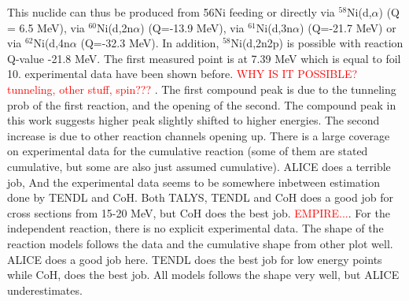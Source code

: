 This nuclide can thus be produced from 56Ni feeding or directly via $^{58}$Ni(d,$\alpha$) (Q = 6.5 MeV), via $^{60}$Ni(d,2n$\alpha$) (Q=-13.9 MeV), via $^{61}$Ni(d,3n$\alpha$) (Q=-21.7 MeV) or via $^{62}$Ni(d,4n$\alpha$ (Q=-32.3 MeV). In addition, $^{58}$Ni(d,2n2p) is possible with reaction Q-value -21.8 MeV. The first measured point is at 7.39 MeV which is equal to foil 10. experimental data have been shown before. \textcolor{red}{WHY IS IT POSSIBLE? tunneling, other stuff, spin??? }. The first compound peak is due to the tunneling prob of the first reaction, and the opening of the second. The compound peak in this work suggests higher peak slightly shifted to higher energies. The second increase is due to other reaction channels opening up. There is a large coverage on experimental data for the cumulative reaction \cite{Ochiai2007, Avrigeanu2016, Takacs2007, Takacs1997, Zweit1991, Usman2016, Amjed2013, Hermanne2013} (some of them are stated cumulative, but some are also just assumed cumulative). ALICE does a terrible job, And the experimental data seems to be somewhere inbetween estimation done by TENDL and CoH. Both TALYS, TENDL and CoH does a good job for cross sections from 15-20 MeV, but CoH does the best job. \textcolor{red}{EMPIRE...}. For the independent reaction, there is no explicit experimental data. The shape of the reaction models follows the data and the cumulative shape from other plot well. ALICE does a good job here. TENDL does the best job for low energy points while CoH, does the best job. All models follows the shape very well, but ALICE underestimates. 



